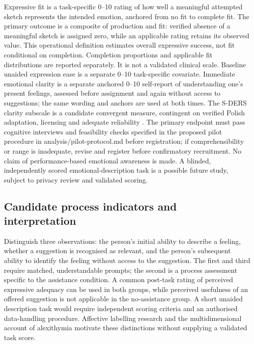 \documentclass[11pt,a4paper]{article}
\begin{document}
Expressive fit is a task-specific 0--10 rating of how well a meaningful attempted sketch represents the intended emotion, anchored from no fit to complete fit. The primary outcome is a composite of production and fit: verified absence of a meaningful sketch is assigned zero, while an applicable rating retains its observed value. This operational definition estimates overall expressive success, not fit conditional on completion. Completion proportions and applicable fit distributions are reported separately. It is not a validated clinical scale. Baseline unaided expression ease is a separate 0--10 task-specific covariate. Immediate emotional clarity is a separate anchored 0--10 self-report of understanding one's present feelings, assessed before assignment and again without access to suggestions; the same wording and anchors are used at both times. The S-DERS clarity subscale is a candidate convergent measure, contingent on verified Polish adaptation, licensing and adequate reliability \parencite{lavender2017}. The primary endpoint must pass cognitive interviews and feasibility checks specified in the proposed pilot procedure in analysis/pilot-protocol.md before registration; if comprehensibility or range is inadequate, revise and register before confirmatory recruitment. No claim of performance-based emotional awareness is made. A blinded, independently scored emotional-description task is a possible future study, subject to privacy review and validated scoring.

\subsection{Candidate process indicators and interpretation}
Distinguish three observations: the person's initial ability to describe a feeling, whether a suggestion is recognised as relevant, and the person's subsequent ability to identify the feeling without access to the suggestion. The first and third require matched, understandable prompts; the second is a process assessment specific to the assistance condition. A common post-task rating of perceived expressive adequacy can be used in both groups, while perceived usefulness of an offered suggestion is not applicable in the no-assistance group. A short unaided description task would require independent scoring criteria and an authorised data-handling procedure. Affective labelling research \citep{lieberman2007} and the multidimensional account of alexithymia \citep{preece2018} motivate these distinctions without supplying a validated task score.
\end{document}
